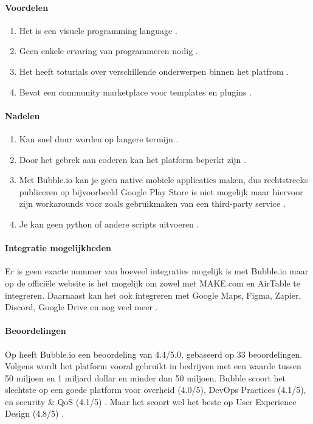 \paragraph*{Voordelen}
\begin{enumerate}
    \item Het is een visuele programming language \autocite{Minor2022}.
    \item Geen enkele ervaring van programmeren nodig \autocite{Minor2022}.
    \item Het heeft toturials over verschillende onderwerpen binnen het platfrom \autocite{Minor2022}.
    \item Bevat een community marketplace voor templates en plugins \autocite{Minor2022}.
\end{enumerate}


\paragraph*{Nadelen}
\begin{enumerate}
    \item Kan snel duur worden op langere termijn \autocite{Minor2022}.
    \item Door het gebrek aan coderen kan het platform beperkt zijn \autocite{Minor2022}.
    \item Met Bubble.io kan je geen native mobiele applicaties maken, dus rechtstreeks publiceren op bijvoorbeeld Google Play Store is niet mogelijk
    maar hiervoor zijn workarounds voor zoals gebruikmaken van een third-party service \autocite{Sharma2022}.
    \item Je kan geen python of andere scripts uitvoeren \autocite{Sharma2022}.
\end{enumerate}

\paragraph{Integratie mogelijkheden}
Er is geen exacte nummer van hoeveel integraties mogelijk is met Bubble.io maar op de officiële website \textcite{Bubble2024a} 
is het mogelijk om zowel met MAKE.com en AirTable te integreren. Daarnaast kan het ook integreren met Google Maps, Figma, Zapier, Discord, Google Drive en nog veel meer \autocite{Bubble2024a}.

\paragraph{Beoordelingen}
Op \textcite{Gartner2024} heeft Bubble.io een beoordeling van 4.4/5.0, gebaseerd op 33 beoordelingen. Volgens \textcite{Gartner2024}
wordt het platform vooral gebruikt in bedrijven met een waarde tussen 50 miljoen en 1 miljard dollar en minder dan 50 miljoen.
Bubble scoort het slechtste op een goede platform voor overheid (4.0/5), DevOps Practices (4.1/5), en security \& QoS  (4.1/5) \autocite{Gartner2024}. Maar het scoort wel
het beste op User Experience Design (4.8/5)  \autocite{Gartner2024}.

